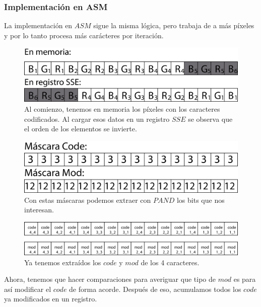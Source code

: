 	\subsubsection{Implementaci\'on en ASM}
	
		La implementaci\'on en $ASM$ sigue la misma l\'ogica, pero trabaja de a m\'as p\'ixeles y por lo tanto procesa m\'as car\'acteres por iteraci\'on.
		
		\begin{figure}[H]
			\includegraphics[scale=0.9]{imgs/fcolor_asm1.png} %
			\caption{Al comienzo, tenemos en memoria los p\'ixeles con los caracteres codificados. Al cargar esos datos en un registro $SSE$ se observa que el orden de los elementos se invierte.} 
		\end{figure}
		
		\begin{figure}[H]
			\includegraphics[scale=0.9]{imgs/decode_asm1.png} 
			\caption{Con estas m\'ascaras podemos extraer con $PAND$ los bits que nos interesan.} 
		\end{figure}
		
		\begin{figure}[H]
			\includegraphics[scale=0.9]{imgs/decode_asm3.png} 
			\caption{Ya tenemos extra\'idos los $code$ y $mod$ de los 4 caracteres.}  
		\end{figure}
		
		
		Ahora, tenemos que hacer comparaciones para averiguar que tipo de $mod$ es para as\'i modificar el $code$ de forma acorde. Despu\'es de eso, acumulamos todos los $code$ ya modificados en un registro.
		
